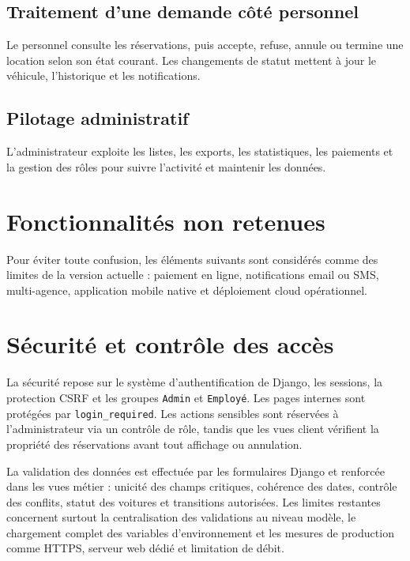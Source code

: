 \subsection{Traitement d'une demande côté personnel}
Le personnel consulte les réservations, puis accepte, refuse, annule ou termine une location selon son état courant. Les changements de statut mettent à jour le véhicule, l'historique et les notifications.

\subsection{Pilotage administratif}
L'administrateur exploite les listes, les exports, les statistiques, les paiements et la gestion des rôles pour suivre l'activité et maintenir les données.

\section{Fonctionnalités non retenues}

Pour éviter toute confusion, les éléments suivants sont considérés comme des limites de la version actuelle : paiement en ligne, notifications email ou SMS, multi-agence, application mobile native et déploiement cloud opérationnel.

\section{Sécurité et contrôle des accès}

La sécurité repose sur le système d'authentification de Django, les sessions, la protection CSRF et les groupes \texttt{Admin} et \texttt{Employé}. Les pages internes sont protégées par \texttt{login\_required}. Les actions sensibles sont réservées à l'administrateur via un contrôle de rôle, tandis que les vues client vérifient la propriété des réservations avant tout affichage ou annulation.

La validation des données est effectuée par les formulaires Django et renforcée dans les vues métier : unicité des champs critiques, cohérence des dates, contrôle des conflits, statut des voitures et transitions autorisées. Les limites restantes concernent surtout la centralisation des validations au niveau modèle, le chargement complet des variables d'environnement et les mesures de production comme HTTPS, serveur web dédié et limitation de débit.
